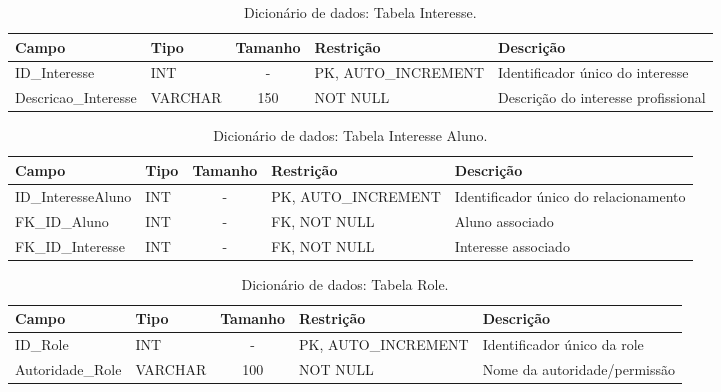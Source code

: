 \begin{table}[H]
    \centering
    \ABNTEXfontereduzida
    \caption[Dicionário de Dados - Tabela Interesse]{Dicionário de dados: Tabela Interesse.}
    \label{tab-tb-interesse}
    \begin{tabular}{p{3.5cm}|p{2cm}|c|p{3.5cm}|p{4cm}}
    \textbf{Campo} & \textbf{Tipo} & \textbf{Tamanho} & \textbf{Restrição} & \textbf{Descrição} \\
    \hline
    ID\_Interesse & INT & - & PK, AUTO\_INCREMENT & Identificador único do interesse \\
    \hline
    Descricao\_Interesse & VARCHAR & 150 & NOT NULL & Descrição do interesse profissional \\
    \end{tabular}
\end{table}

\begin{table}[H]
    \centering
    \ABNTEXfontereduzida
    \caption[Dicionário de Dados - Tabela Interesse Aluno]{Dicionário de dados: Tabela Interesse Aluno.}
    \label{tab-tb-interesse-aluno}
    \begin{tabular}{p{3.5cm}|p{2cm}|c|p{3.5cm}|p{4cm}}
    \textbf{Campo} & \textbf{Tipo} & \textbf{Tamanho} & \textbf{Restrição} & \textbf{Descrição} \\
    \hline
    ID\_InteresseAluno & INT & - & PK, AUTO\_INCREMENT & Identificador único do relacionamento \\
    \hline
    FK\_ID\_Aluno & INT & - & FK, NOT NULL & Aluno associado \\
    \hline
    FK\_ID\_Interesse & INT & - & FK, NOT NULL & Interesse associado \\
    \end{tabular}
\end{table}

\begin{table}[H]
    \centering
    \ABNTEXfontereduzida
    \caption[Dicionário de Dados - Tabela Role]{Dicionário de dados: Tabela Role.}
    \label{tab-tb-role}
    \begin{tabular}{p{3.5cm}|p{2cm}|c|p{3.5cm}|p{4cm}}
    \textbf{Campo} & \textbf{Tipo} & \textbf{Tamanho} & \textbf{Restrição} & \textbf{Descrição} \\
    \hline
    ID\_Role & INT & - & PK, AUTO\_INCREMENT & Identificador único da role \\
    \hline
    Autoridade\_Role & VARCHAR & 100 & NOT NULL & Nome da autoridade/permissão \\
    \end{tabular}
\end{table}

